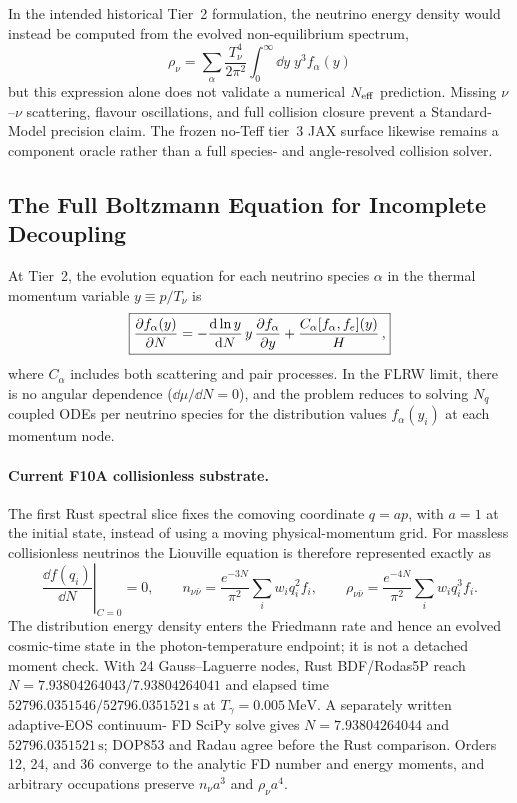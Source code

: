 In the intended historical Tier~2 formulation, the neutrino energy density would instead be computed from the evolved non-equilibrium spectrum,
\begin{equation}
\rho_\nu = \sum_\alpha \frac{T_\nu^4}{2\pi^2}\int_0^\infty \dd y\; y^3 f_\alpha(y)
\end{equation}
but this expression alone does not validate a numerical $N_{\rm eff}$ prediction.  Missing $\nu$--$\nu$ scattering, flavour oscillations, and full collision closure prevent a Standard-Model precision claim.  The frozen no-Teff tier~3 JAX surface likewise remains a component oracle rather than a full species- and angle-resolved collision solver.

\subsection{The Full Boltzmann Equation for Incomplete Decoupling}

At Tier~2, the evolution equation for each neutrino species $\alpha$ in the thermal momentum variable $y \equiv p/T_\nu$ is
\begin{equation}
\boxed{\frac{\partial f_\alpha(y)}{\partial N} = -\frac{\mathrm{d}\ln y}{\mathrm{d} N}\,y\,\frac{\partial f_\alpha}{\partial y} + \frac{C_\alpha[f_\alpha, f_e](y)}{H}\,,}\label{eq:boltzmann_tier2}
\end{equation}
where $C_\alpha$ includes both scattering and pair processes.  In the FLRW limit, there is no angular dependence ($\dd\mu/\dd N = 0$), and the problem reduces to solving $N_q$ coupled ODEs per neutrino species for the distribution values $f_\alpha(y_i)$ at each momentum node.

\paragraph{Current F10A collisionless substrate.} The first Rust spectral
slice fixes the comoving coordinate $q=ap$, with $a=1$ at the initial state,
instead of using a moving physical-momentum grid.  For massless collisionless
neutrinos the Liouville equation is therefore represented exactly as
\begin{equation}
\left.\frac{\dd f(q_i)}{\dd N}\right|_{C=0}=0,
\qquad
n_{\nu\bar\nu}=\frac{e^{-3N}}{\pi^2}\sum_iw_iq_i^2f_i,
\qquad
\rho_{\nu\bar\nu}=\frac{e^{-4N}}{\pi^2}\sum_iw_iq_i^3f_i .
\end{equation}
The distribution energy density enters the Friedmann rate and hence an
evolved cosmic-time state in the photon-temperature endpoint; it is not a
detached moment check.  With 24 Gauss--Laguerre nodes, Rust BDF/Rodas5P reach
$N=7.93804264043/7.93804264041$ and elapsed time
$52796.0351546/52796.0351521\,\mathrm{s}$ at
$T_\gamma=0.005\,\mathrm{MeV}$.  A separately written adaptive-EOS continuum-
FD SciPy solve gives $N=7.93804264044$ and
$52796.0351521\,\mathrm{s}$; DOP853 and Radau agree before the Rust comparison.
Orders 12, 24, and 36 converge to the analytic FD number and energy moments,
and arbitrary occupations preserve $n_\nu a^3$ and $\rho_\nu a^4$.

